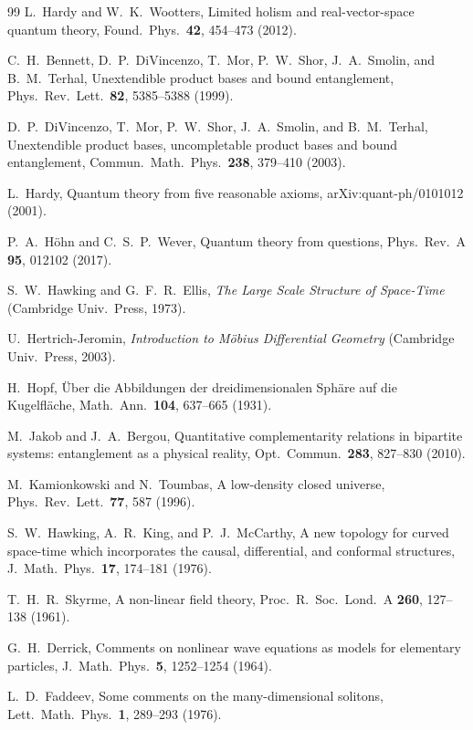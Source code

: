 \documentclass[aps,pra,onecolumn,superscriptaddress,nofootinbib,10pt]{revtex4-2}
\theoremstyle{definition}
\theoremstyle{remark}
\begin{document}
\begin{thebibliography}{99}
 L.~Hardy and W.~K.~Wootters, Limited holism and real-vector-space quantum theory, Found.\ Phys.\ \textbf{42}, 454--473 (2012).

 C.~H.~Bennett, D.~P.~DiVincenzo, T.~Mor, P.~W.~Shor, J.~A.~Smolin, and B.~M.~Terhal, Unextendible product bases and bound entanglement, Phys.\ Rev.\ Lett.\ \textbf{82}, 5385--5388 (1999).

 D.~P.~DiVincenzo, T.~Mor, P.~W.~Shor, J.~A.~Smolin, and B.~M.~Terhal, Unextendible product bases, uncompletable product bases and bound entanglement, Commun.\ Math.\ Phys.\ \textbf{238}, 379--410 (2003).

 L.~Hardy, Quantum theory from five reasonable axioms, arXiv:quant-ph/0101012 (2001).

 P.~A.~H\"ohn and C.~S.~P.~Wever, Quantum theory from questions, Phys.\ Rev.\ A \textbf{95}, 012102 (2017).

 S.~W.~Hawking and G.~F.~R.~Ellis, \emph{The Large Scale Structure of Space-Time} (Cambridge Univ.\ Press, 1973).

 U.~Hertrich-Jeromin, \emph{Introduction to M\"obius Differential Geometry} (Cambridge Univ.\ Press, 2003).

 H.~Hopf, \"Uber die Abbildungen der dreidimensionalen Sph\"are auf die Kugelfl\"ache, Math.\ Ann.\ \textbf{104}, 637--665 (1931).

 M.~Jakob and J.~A.~Bergou, Quantitative complementarity relations in bipartite systems: entanglement as a physical reality, Opt.\ Commun.\ \textbf{283}, 827--830 (2010).

 M.~Kamionkowski and N.~Toumbas, A low-density closed universe, Phys.\ Rev.\ Lett.\ \textbf{77}, 587 (1996).

 S.~W.~Hawking, A.~R.~King, and P.~J.~McCarthy, A new topology for curved space-time which incorporates the causal, differential, and conformal structures, J.\ Math.\ Phys.\ \textbf{17}, 174--181 (1976).

 T.~H.~R.~Skyrme, A non-linear field theory, Proc.\ R.\ Soc.\ Lond.\ A \textbf{260}, 127--138 (1961).

 G.~H.~Derrick, Comments on nonlinear wave equations as models for elementary particles, J.\ Math.\ Phys.\ \textbf{5}, 1252--1254 (1964).

 L.~D.~Faddeev, Some comments on the many-dimensional solitons, Lett.\ Math.\ Phys.\ \textbf{1}, 289--293 (1976).


\end{thebibliography}
\end{document}
